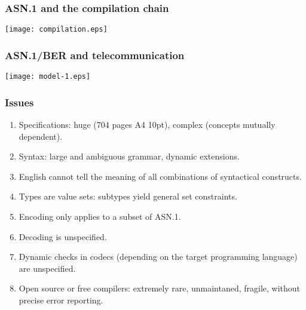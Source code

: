 \documentclass[compress,dvips,xcolor={dvipsnames},t]{beamer}
\newcommand\ASN{\textsf{ASN.1}\xspace}
\begin{document}
\begin{frame}
\frametitle{\ASN and the compilation chain}

\begin{center}
\texttt{[image: compilation.eps]}
\end{center}

\end{frame}

\begin{frame}
\frametitle{\ASN/BER and telecommunication}

\begin{center}
\texttt{[image: model-1.eps]}
\end{center}

\end{frame}

\begin{frame}
\frametitle{Issues}

\begin{enumerate}

  \item Specifications: huge (704 pages A4 10pt), complex (concepts
  mutually dependent).

  \item Syntax: large and ambiguous grammar, dynamic extensions.

  \item English cannot tell the meaning of all combinations of
    syntactical constructs.
  
  \item Types are value sets: subtypes yield general set constraints.

  \item Encoding only applies to a subset of \ASN.

  \item Decoding is unspecified.

  \item Dynamic checks in codecs (depending on the target programming
    language) are unspecified.

  \item Open source or free compilers: extremely rare, unmaintaned,
    fragile, without precise error reporting.

\end{enumerate}

\end{frame}
\end{document}
